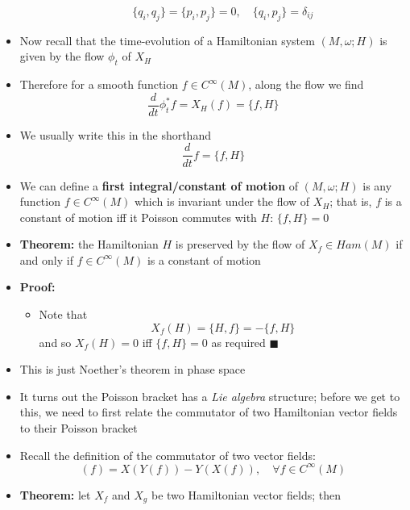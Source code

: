 \documentclass[12pt,a4paper]{article}
\numberwithin{equation}{section}
\begin{document}
\begin{itemize}
\begin{itemize}
\begin{equation}
				\{q_{i},q_{j}\}=\{p_{i},p_{j}\}=0,\quad\{q_{i},p_{j}\}=\delta_{ij}
			\end{equation}
		\end{itemize}
		\item Now recall that the time-evolution of a Hamiltonian system $(M,\omega;H)$ is given by the flow $\phi_{t}$ of $X_{H}$
		\item Therefore for a smooth function $f\in C^{\infty}(M)$, along the flow we find
		\begin{equation}
			\frac{d}{dt}\phi_{t}^{*}f=X_{H}(f)=\{f,H\}
		\end{equation}
		\item We usually write this in the shorthand
		\begin{equation}
			\frac{d}{dt}f=\{f,H\}
		\end{equation}
		\item We can define a \textbf{first integral/constant of motion} of $(M,\omega;H)$ is any function $f\in C^{\infty}(M)$ which is invariant under the flow of $X_{H}$; that is, $f$ is a constant of motion iff it Poisson commutes with $H$: $\{f,H\}=0$
		\item \textbf{Theorem:} the Hamiltonian $H$ is preserved by the flow of $X_{f}\in Ham(M)$ if and only if $f\in C^{\infty}(M)$ is a constant of motion
		\item \textbf{Proof:}
		\begin{itemize}
			\item Note that
			\begin{equation}
				X_{f}(H)=\{H,f\}=-\{f,H\}
			\end{equation}
			and so $X_{f}(H)=0$ iff $\{f,H\}=0$ as required $\blacksquare$
		\end{itemize}
		\item This is just Noether's theorem in phase space
		\item It turns out the Poisson bracket has a \textit{Lie algebra} structure; before we get to this, we need to first relate the commutator of two Hamiltonian vector fields to their Poisson bracket
		\item Recall the definition of the commutator of two vector fields:
		\begin{equation}
			[X,Y](f)=X(Y(f))-Y(X(f)),\quad\forall f\in C^{\infty}(M)
		\end{equation}
		\item \textbf{Theorem:} let $X_{f}$ and $X_{g}$ be two Hamiltonian vector fields; then
		\begin{equation}

\end{equation}
\end{itemize}
\end{document}
